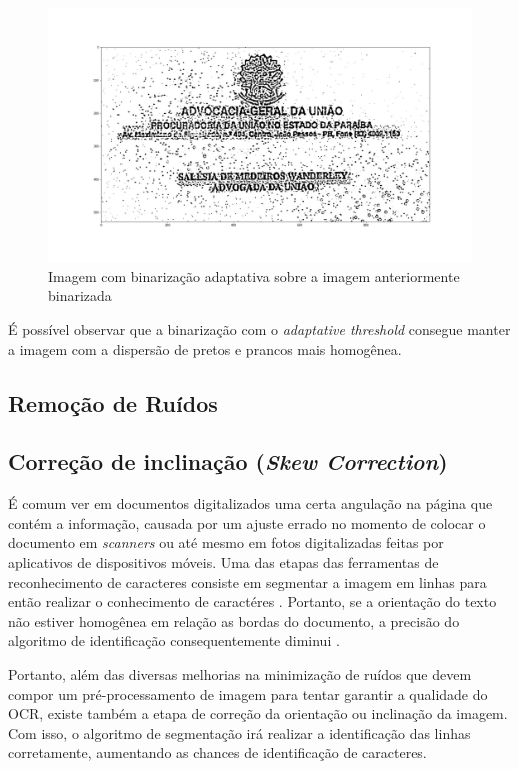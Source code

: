 \begin{figure}[h]
  \centering
  \caption{Imagem com binarização adaptativa sobre a imagem anteriormente binarizada}
  \includegraphics[scale=0.25]{figuras/binarization-adaptative-threshold.jpg}
\end{figure}

É possível observar que a binarização com o \textit{adaptative threshold} consegue manter a imagem com a dispersão de pretos e prancos mais homogênea.


\subsection{Remoção de Ruídos}


\subsection{Correção de inclinação (\textit{Skew Correction})}

É comum ver em documentos digitalizados uma certa angulação na página que contém a informação, causada por um ajuste errado no momento de colocar o documento em \textit{scanners} ou até mesmo em fotos digitalizadas feitas por aplicativos de dispositivos móveis. Uma das etapas das ferramentas de reconhecimento de caracteres consiste em segmentar a imagem em linhas para então realizar o conhecimento de caractéres \cite{ocr-survey}. Portanto, se a orientação do texto não estiver homogênea em relação as bordas do documento, a precisão do algoritmo de identificação consequentemente diminui \cite{metrics-for-ocr-performance}.

Portanto, além das diversas melhorias na minimização de ruídos que devem compor um pré-processamento de imagem para tentar garantir a qualidade do OCR, existe também a etapa de correção da orientação ou inclinação da imagem. Com isso, o algoritmo de segmentação irá realizar a identificação das linhas corretamente, aumentando as chances de identificação de caracteres.

